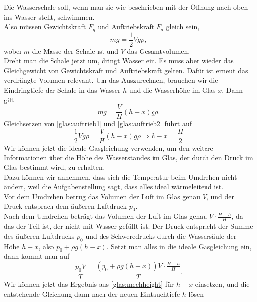 \begin{Answer}[ref = glas]
	Die Wasserschale soll, wenn man sie wie beschrieben mit der Öffnung nach oben ins Wasser stellt, schwimmen.\\
	Also müssen Gewichtskraft $F_g$ und Auftriebskraft $F_a$ gleich sein,
	\begin{equation}\label{glas:auftrieb1}
		m g = \frac{1}{2}Vg\rho,
	\end{equation}
	wobei $m$ die Masse der Schale ist und $V$ das Gesamtvolumen.\\
	Dreht man die Schale jetzt um, dringt Wasser ein. Es muss aber wieder das Gleichgewicht von Gewichtskraft und Auftriebskraft gelten. Dafür ist erneut das verdrängte Volumen relevant. Um das Auszurechnen, brauchen wir die Eindringtiefe der Schale in das Wasser $h$ und die Wasserhöhe im Glas $x$. Dann gilt
	\begin{equation}\label{glas:auftrieb2}
		mg = \frac{V}{H}\left(h-x\right) g \rho.
	\end{equation}
	Gleichsetzen von \eqref{glas:auftrieb1} und \eqref{glas:auftrieb2} führt auf
	\begin{equation}\label{glas:mechheight}
		\frac{1}{2}Vg\rho = \frac{V}{H}\left(h-x\right) g \rho \Rightarrow h-x = \frac{H}{2}
	\end{equation}
	Wir können jetzt die ideale Gasgleichung verwenden, um den weitere Informationen über die Höhe des Wasserstandes im Glas, der durch den Druck im Glas bestimmt wird, zu erhalten.\\
	Dazu können wir annehmen, dass sich die Temperatur beim Umdrehen nicht ändert, weil die Aufgabenstellung sagt, dass alles ideal wärmeleitend ist.\\
	Vor dem Umdrehen betrug das Volumen der  Luft im Glas genau $V$, und der Druck entsprach dem äußeren Luftdruck $p_0$.\\
	Nach dem Umdrehen beträgt das Volumen der Luft im Glas genau $V \cdot \frac{H-h}{H}$, da das der Teil ist, der nicht mit Wasser gefüllt ist. Der Druck entspricht der Summe des äußeren Luftdrucks $p_0$ und des Schweredrucks durch die Wassersäule der Höhe $h-x$, also $p_0 + \rho g \left(h-x\right)$. Setzt man alles in die ideale Gasgleichung ein, dann kommt man auf
	\begin{equation}
		\frac{p_0 V}{T} = \frac{\left(p_0 + \rho g \left(h-x\right) \right) V \cdot \frac{H-h}{H}}{T}.
	\end{equation}
	Wir können jetzt das Ergebnis aus \eqref{glas:mechheight} für $h-x$ einsetzen, und die entstehende Gleichung dann nach der neuen Eintauchtiefe $h$ lösen

\end{Answer}
